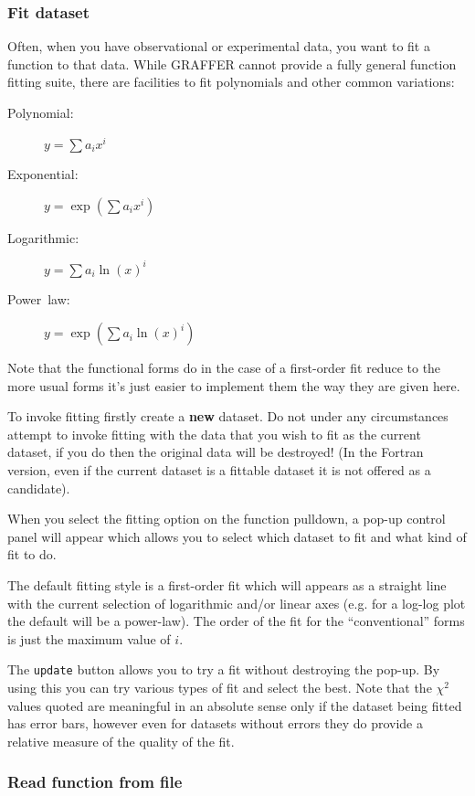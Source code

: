 \documentclass[11pt,twoside,english]{article}
\begin{document}
\subsubsection{Fit dataset }

Often, when you have observational or experimental data, you want to
fit a function to that data. While GRAFFER cannot provide a fully
general function fitting suite, there are facilities to fit polynomials
and other common variations:

\begin{description}
\item [Polynomial:]$y=\sum a_{i}x^{i}$
\item [Exponential:]$y=\exp(\sum a_{i}x^{i})$
\item [Logarithmic:]$y=\sum a_{i}\ln(x)^{i}$
\item [Power~law:]$y=\exp(\sum a_{i}\ln(x)^{i})$
\end{description}
Note that the functional forms do in the case of a first-order fit
reduce to the more usual forms it's just easier to implement them the
way they are given here.

To invoke fitting firstly create a \textbf{new} dataset. Do not under
any circumstances attempt to invoke fitting with the data that you wish
to fit as the current dataset, if you do then the original data will be
destroyed! (In the Fortran version, even if the current dataset is a
fittable dataset it is not offered as a candidate).

When you select the fitting option on the function pulldown, a pop-up
control panel will appear which allows you to select which dataset to
fit and what kind of fit to do.

The default fitting style is a first-order fit which will appears as a
straight line with the current selection of logarithmic and/or linear
axes (e.g. for a log-log plot the default will be a power-law).  The
order of the fit for the {}``conventional'' forms is just the maximum
value of $i$.


The \texttt{update} button allows you to try a fit without destroying
the pop-up. By using this you can try various types of fit and select
the best. Note that the $\chi^{2}$ values quoted are meaningful in an
absolute sense only if the dataset being fitted has error bars, however
even for datasets without errors they do provide a relative measure of
the quality of the fit.


\subsubsection{Read function from file}
\end{document}
